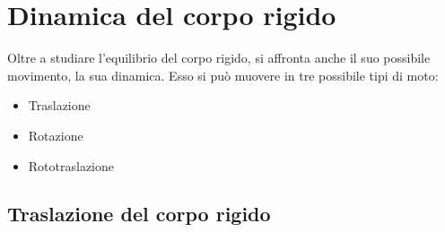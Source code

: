 \documentclass[10pt,a4paper]{book}
\begin{document}
\section{Dinamica del corpo rigido}

Oltre a studiare l'equilibrio del corpo rigido, si affronta anche il suo possibile movimento, la sua dinamica. Esso si può muovere in tre possibile tipi di moto:
\begin{itemize}
	\item Traslazione
	\item Rotazione
	\item Rototraslazione
\end{itemize}

\subsection{Traslazione del corpo rigido}
\end{document}
